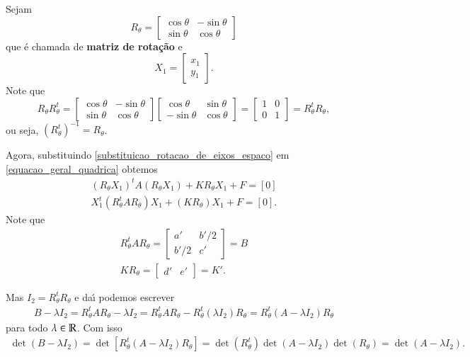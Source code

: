 Sejam
\[
  R_\theta = \begin{bmatrix}
    \cos\theta & -\sin\theta\\
    \sin\theta & \cos\theta
  \end{bmatrix}
\]
que \'e chamada de \textbf{matriz de rota\c{c}\~ao} e
\[
  X_1 = \begin{bmatrix}x_1\\y_1\end{bmatrix}.
\]
Note que
\[
  R_\theta R_\theta^t = \begin{bmatrix}
    \cos\theta & -\sin\theta\\
    \sin\theta & \cos\theta
  \end{bmatrix}\begin{bmatrix}
    \cos\theta & \sin\theta\\
    -\sin\theta & \cos\theta
  \end{bmatrix} = \begin{bmatrix}
    1 & 0\\
    0 & 1
  \end{bmatrix} = R_\theta^t R_\theta, 
\]
ou seja, $(R_\theta^t)^{-1} = R_\theta$.

Agora, substituindo \eqref{substituicao_rotacao_de_eixos_espaco} em \eqref{equacao_geral_quadrica} obtemos
\begin{align*}
  (R_\theta X_1)^t A (R_\theta X_1) + KR_\theta X_1 + F = [0]\\
  X_1^t(R_\theta^t A R_\theta)X_1 + (KR_\theta)X_1 + F = [0].
\end{align*}
Note que
\begin{align*}
  R_\theta^t A R_\theta = \begin{bmatrix}
    a' & b'/2\\
    b'/2 & c'
  \end{bmatrix} = B\\
  KR_\theta = \begin{bmatrix}
    d'& e'
  \end{bmatrix} = K'.
\end{align*}

Mas $I_2 = R_\theta^t R_\theta$ e da{\'\i} podemos escrever
\begin{align*}
  B - \lambda I_2 = R_\theta^t A R_\theta - \lambda I_2 = R_\theta^t A R_\theta - R_\theta^t (\lambda I_2) R_\theta = R_\theta^t (A - \lambda I_2)R_\theta
\end{align*}
para todo $\lambda \in \mathbb{R}$. Com isso
\begin{align*}
  \det(B - \lambda I_2) = \det[R_\theta^t(A - \lambda I_2)R_\theta] = \det(R_\theta^t)\det(A - \lambda I_2)\det(R_\theta) = \det(A - \lambda I_2).
\end{align*}

